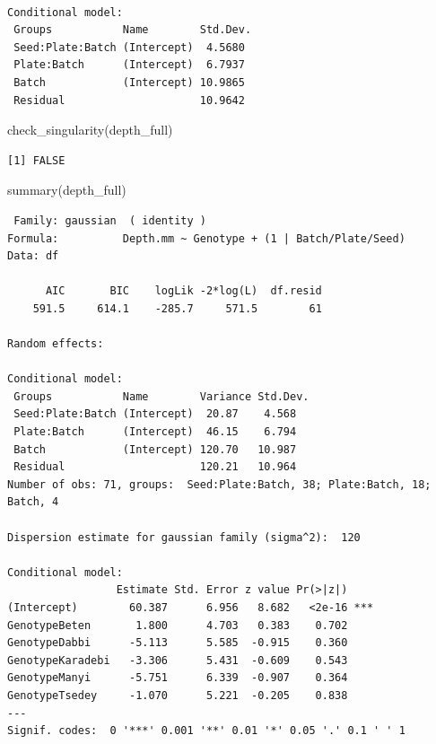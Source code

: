 \documentclass[
  letterpaper,
  DIV=11,
  numbers=noendperiod]{scrartcl}
\newenvironment{Shaded}{\begin{snugshade}}{\end{snugshade}}
\newcommand{\FunctionTok}[1]{\textcolor[rgb]{0.28,0.35,0.67}{#1}}
\newcommand{\NormalTok}[1]{\textcolor[rgb]{0.00,0.23,0.31}{#1}}
\begin{document}
\begin{verbatim}

Conditional model:
 Groups           Name        Std.Dev.
 Seed:Plate:Batch (Intercept)  4.5680 
 Plate:Batch      (Intercept)  6.7937 
 Batch            (Intercept) 10.9865 
 Residual                     10.9642 
\end{verbatim}

\begin{Shaded}
\begin{Highlighting}[]
\FunctionTok{check\_singularity}\NormalTok{(depth\_full)}
\end{Highlighting}
\end{Shaded}

\begin{verbatim}
[1] FALSE
\end{verbatim}

\begin{Shaded}
\begin{Highlighting}[]
\FunctionTok{summary}\NormalTok{(depth\_full)}
\end{Highlighting}
\end{Shaded}

\begin{verbatim}
 Family: gaussian  ( identity )
Formula:          Depth.mm ~ Genotype + (1 | Batch/Plate/Seed)
Data: df

      AIC       BIC    logLik -2*log(L)  df.resid 
    591.5     614.1    -285.7     571.5        61 

Random effects:

Conditional model:
 Groups           Name        Variance Std.Dev.
 Seed:Plate:Batch (Intercept)  20.87    4.568  
 Plate:Batch      (Intercept)  46.15    6.794  
 Batch            (Intercept) 120.70   10.987  
 Residual                     120.21   10.964  
Number of obs: 71, groups:  Seed:Plate:Batch, 38; Plate:Batch, 18; Batch, 4

Dispersion estimate for gaussian family (sigma^2):  120 

Conditional model:
                 Estimate Std. Error z value Pr(>|z|)    
(Intercept)        60.387      6.956   8.682   <2e-16 ***
GenotypeBeten       1.800      4.703   0.383    0.702    
GenotypeDabbi      -5.113      5.585  -0.915    0.360    
GenotypeKaradebi   -3.306      5.431  -0.609    0.543    
GenotypeManyi      -5.751      6.339  -0.907    0.364    
GenotypeTsedey     -1.070      5.221  -0.205    0.838    
---
Signif. codes:  0 '***' 0.001 '**' 0.01 '*' 0.05 '.' 0.1 ' ' 1
\end{verbatim}
\end{document}
